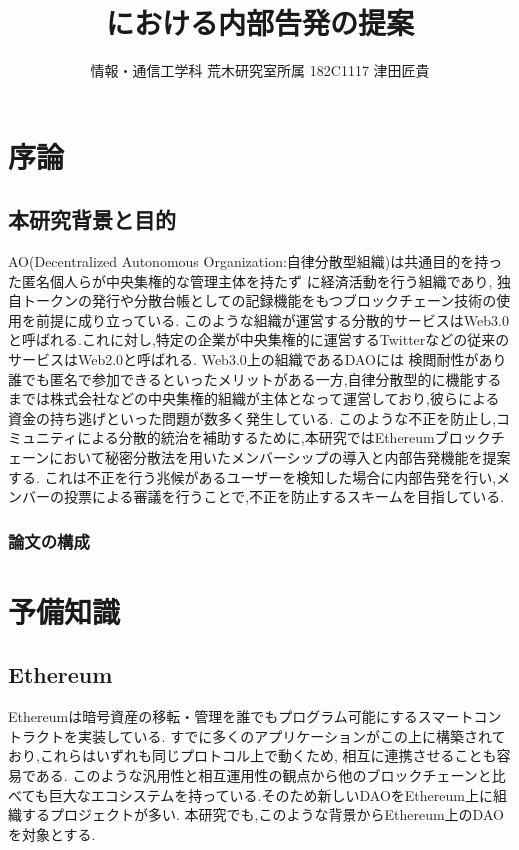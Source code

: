 \documentclass[10pt,a4paper,titlepage]{jarticle}
\title{\vspace{-1.5cm}\normalsize {\textbf {における内部告発の提案}}}
\author{\vspace{-1.1cm} \normalsize	情報・通信工学科 荒木研究室所属 182C1117 津田匠貴}
\date{}
\begin{document}
\vspace{-10pt}
\maketitle
\section{序論}
\subsection{本研究背景と目的}
AO(Decentralized Autonomous Organization:自律分散型組織)は共通目的を持った匿名個人らが中央集権的な管理主体を持たず
に経済活動を行う組織であり, 独自トークンの発行や分散台帳としての記録機能をもつブロックチェーン技術の使用を前提に成り立っている.
このような組織が運営する分散的サービスはWeb3.0と呼ばれる.これに対し,特定の企業が中央集権的に運営するTwitterなどの従来のサービスはWeb2.0と呼ばれる.
Web3.0上の組織であるDAOには 検閲耐性があり誰でも匿名で参加できるといったメリットがある一方,自律分散型的に機能するまでは株式会社などの中央集権的組織が主体となって運営しており,彼らによる資金の持ち逃げといった問題が数多く発生している.
このような不正を防止し,コミュニティによる分散的統治を補助するために,本研究ではEthereumブロックチェーンにおいて秘密分散法を用いたメンバーシップの導入と内部告発機能を提案する.
これは不正を行う兆候があるユーザーを検知した場合に内部告発を行い,メンバーの投票による審議を行うことで,不正を防止するスキームを目指している.
\subsubsection{論文の構成}
\section{予備知識}
\subsection{Ethereum}
Ethereumは暗号資産の移転・管理を誰でもプログラム可能にするスマートコントラクトを実装している.
すでに多くのアプリケーションがこの上に構築されており,これらはいずれも同じプロトコル上で動くため, 相互に連携させることも容易である.
このような汎用性と相互運用性の観点から他のブロックチェーンと比べても巨大なエコシステムを持っている.そのため新しいDAOをEthereum上に組織するプロジェクトが多い.
本研究でも,このような背景からEthereum上のDAOを対象とする.
\end{document}
